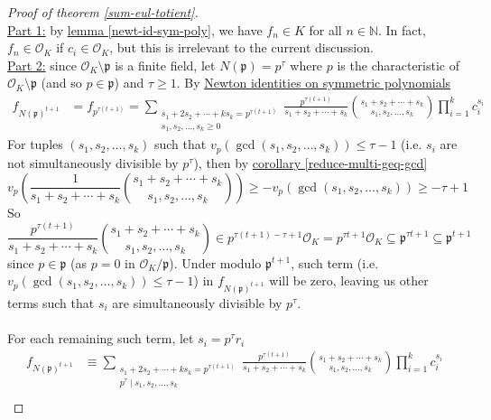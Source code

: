 \documentclass{treatise}
\begin{document}
\begin{proof}[Proof of theorem \ref*{sum-eul-totient}] \ \\
\underline{Part 1:} by \hyperref[newt-id-sym-poly]{lemma \ref*{newt-id-sym-poly}}, we have $f_n \in K$ for all $n \in \mathbb{N}$. In fact, $f_n \in \mathcal{O}_K$ if $c_i \in \mathcal{O}_K$, but this is irrelevant to the current discussion.
\\
\underline{Part 2:} since $\mathcal{O}_K \setminus \mathfrak{p}$ is a finite field, let $N(\mathfrak{p}) = p^\tau$ where $p$ is the characteristic of $\mathcal{O}_K \setminus \mathfrak{p}$ (and so $p \in \mathfrak{p}$) and $\tau \geq 1$. By \hyperref[newt-id-sym-poly]{Newton identities on symmetric polynomials}
\begin{align*}
f_{N(\mathfrak{p})^{t + 1}} & = f_{p^{\tau (t + 1)}} = \sum_{\substack{s_1 + 2s_2 + \cdots + k s_k = p^{\tau (t + 1)} \\ s_1, s_2, \hdots, s_k \geq 0}} \frac{p^{\tau (t + 1)}}{s_1 + s_2 + \cdots + s_k} {s_1 + s_2 + \cdots + s_k \choose s_1, s_2, \hdots, s_k} \prod_{i = 1}^k c_i^{s_i}
\end{align*}
For tuples $(s_1, s_2, \hdots, s_k)$ such that $v_p (\gcd(s_1, s_2, \hdots, s_k)) \leq \tau - 1$ (i.e. $s_i$ are not simultaneously divisible by $p^\tau$), then by \hyperref[reduce-multi-geq-gcd]{corollary \ref*{reduce-multi-geq-gcd}}
$$v_p \left( \frac{1}{s_1 + s_2 + \cdots + s_k} {s_1 + s_2 + \cdots + s_k \choose s_1, s_2, \hdots, s_k} \right) \geq - v_p (\gcd(s_1, s_2, \hdots, s_k)) \geq - \tau + 1$$
So
$$\frac{p^{\tau(t + 1)}}{s_1 + s_2 + \cdots + s_k} {s_1 + s_2 + \cdots + s_k \choose s_1, s_2, \hdots, s_k} \in p^{\tau (t + 1) - \tau + 1} \mathcal{O}_K = p^{\tau t + 1} \mathcal{O}_K \subseteq \mathfrak{p}^{\tau t + 1} \subseteq \mathfrak{p}^{t + 1}$$
since $p \in \mathfrak{p}$ (as $p = 0$ in $\mathcal{O}_K / \mathfrak{p}$). Under modulo $\mathfrak{p}^{t + 1}$, such term (i.e. $v_p(\gcd(s_1, s_2, \hdots, s_k)) \leq \tau - 1$) in $f_{N(\mathfrak{p})^{t + 1}}$ will be zero, leaving us other terms such that $s_i$ are simultaneously divisible by $p^\tau$.
\\
\\
For each remaining such term, let $s_i = p^\tau r_i$
\begin{align*}
f_{N(\mathfrak{p})^{t + 1}} & \equiv \sum_{\substack{s_1 + 2s_2 + \cdots + k s_k = p^{\tau (t + 1)} \\ p^\tau \mid s_1, s_2, \hdots, s_k}} \frac{p^{\tau (t + 1)}}{s_1 + s_2 + \cdots + s_k} {s_1 + s_2 + \cdots + s_k \choose s_1, s_2, \hdots, s_k} \prod_{i = 1}^k c_i^{s_i} \\

\end{align*}
\end{proof}
\end{document}
